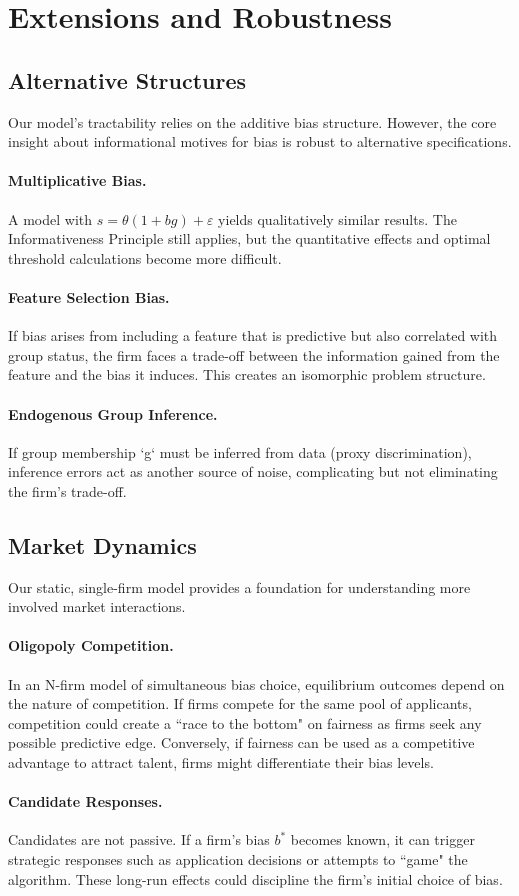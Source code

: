 \section{Extensions and Robustness}

\subsection{Alternative Structures}
Our model's tractability relies on the additive bias structure. However, the core insight about informational motives for bias is robust to alternative specifications.

\paragraph{Multiplicative Bias.} A model with $s = \theta(1+bg) + \varepsilon$ yields qualitatively similar results. The Informativeness Principle still applies, but the quantitative effects and optimal threshold calculations become more difficult.

\paragraph{Feature Selection Bias.} If bias arises from including a feature that is predictive but also correlated with group status, the firm faces a trade-off between the information gained from the feature and the bias it induces. This creates an isomorphic problem structure.

\paragraph{Endogenous Group Inference.} If group membership `g` must be inferred from data (proxy discrimination), inference errors act as another source of noise, complicating but not eliminating the firm's trade-off.

\subsection{Market Dynamics}
Our static, single-firm model provides a foundation for understanding more involved market interactions.

\paragraph{Oligopoly Competition.} In an N-firm model of simultaneous bias choice, equilibrium outcomes depend on the nature of competition. If firms compete for the same pool of applicants, competition could create a ``race to the bottom" on fairness as firms seek any possible predictive edge. Conversely, if fairness can be used as a competitive advantage to attract talent, firms might differentiate their bias levels.

\paragraph{Candidate Responses.} Candidates are not passive. If a firm's bias $b^*$ becomes known, it can trigger strategic responses such as application decisions or attempts to ``game" the algorithm. These long-run effects could discipline the firm's initial choice of bias.
